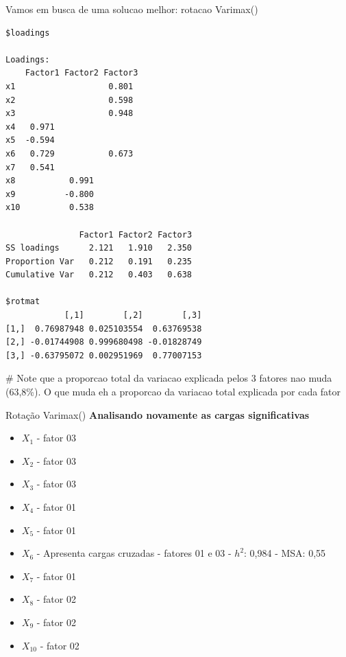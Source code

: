 \documentclass[
  ignorenonframetext,
  aspectratio=169,
]{beamer}
\newenvironment{Shaded}{\begin{snugshade}}{\end{snugshade}}
\newcommand{\CommentTok}[1]{\textcolor[rgb]{0.37,0.37,0.37}{#1}}
\newcommand{\FunctionTok}[1]{\textcolor[rgb]{0.28,0.35,0.67}{#1}}
\newcommand{\NormalTok}[1]{\textcolor[rgb]{0.00,0.23,0.31}{#1}}
\newcommand{\SpecialCharTok}[1]{\textcolor[rgb]{0.37,0.37,0.37}{#1}}
\providecommand{\tightlist}{%
  \setlength{\itemsep}{0pt}\setlength{\parskip}{0pt}}
\begin{document}
\begin{frame}[fragile]{Vamos em busca de uma solucao melhor: rotacao
Varimax()}
\label{vamos-em-busca-de-uma-solucao-melhor-rotacao-varimax}
\begin{Shaded}
\end{Shaded}

\begin{verbatim}
$loadings

Loadings:
    Factor1 Factor2 Factor3
x1                   0.801 
x2                   0.598 
x3                   0.948 
x4   0.971                 
x5  -0.594                 
x6   0.729           0.673 
x7   0.541                 
x8           0.991         
x9          -0.800         
x10          0.538         

               Factor1 Factor2 Factor3
SS loadings      2.121   1.910   2.350
Proportion Var   0.212   0.191   0.235
Cumulative Var   0.212   0.403   0.638

$rotmat
            [,1]        [,2]        [,3]
[1,]  0.76987948 0.025103554  0.63769538
[2,] -0.01744908 0.999680498 -0.01828749
[3,] -0.63795072 0.002951969  0.77007153
\end{verbatim}

\begin{Shaded}
\begin{Highlighting}[]
\CommentTok{\# Note que a proporcao total da variacao explicada pelos 3 fatores nao muda (63,8\%). O que muda eh a proporcao da variacao total explicada por cada fator}
\end{Highlighting}
\end{Shaded}
\end{frame}

\begin{frame}{Rotação Varimax()}
\label{rotauxe7uxe3o-varimax}
\textbf{Analisando novamente as cargas significativas}

\begin{itemize}
\tightlist
\item
  \(X_1\) - fator 03
\item
  \(X_2\) - fator 03
\item
  \(X_3\) - fator 03
\item
  \(X_4\) - fator 01
\item
  \(X_5\) - fator 01
\item
  \(X_6\) - Apresenta cargas cruzadas - fatores 01 e 03 - \(h^2\): 0,984
  - MSA: 0,55
\item
  \(X_7\) - fator 01
\item
  \(X_8\) - fator 02
\item
  \(X_9\) - fator 02
\item
  \(X_{10}\) - fator 02
\end{itemize}
\end{frame}
\end{document}
